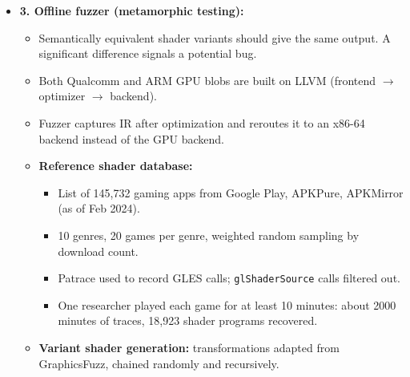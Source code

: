 \documentclass[11pt,a4paper]{article}
\begin{document}
\begin{enumerate}
\begin{itemize}[leftmargin=*, itemsep=1pt, topsep=2pt]
\begin{itemize}[itemsep=0pt]
\begin{itemize}[itemsep=0pt]
                \item ARM: \texttt{r\{major\}p\{patch\}}.
            \end{itemize}
            \item LLVM compiler version, used when internal version is missing.
            \begin{itemize}[itemsep=0pt]
                \item Regex on version string if not stripped.
                \item Stripped binaries: string fingerprints from LLVM logging statements.
                \item Also Binshape [16] function fingerprinting.
            \end{itemize}
        \end{itemize}
        \item \textbf{3. Offline fuzzer (metamorphic testing):}
        \begin{itemize}[itemsep=0pt]
            \item Semantically equivalent shader variants should give the same output. A significant difference signals a potential bug.
            \item Both Qualcomm and ARM GPU blobs are built on LLVM (frontend $\rightarrow$ optimizer $\rightarrow$ backend).
            \item Fuzzer captures IR after optimization and reroutes it to an x86-64 backend instead of the GPU backend.
            \item \textbf{Reference shader database:}
            \begin{itemize}[itemsep=0pt]
                \item List of 145,732 gaming apps from Google Play, APKPure, APKMirror (as of Feb 2024).
                \item 10 genres, 20 games per genre, weighted random sampling by download count.
                \item Patrace used to record GLES calls; \texttt{glShaderSource} calls filtered out.
                \item One researcher played each game for at least 10 minutes: about 2000 minutes of traces, 18,923 shader programs recovered.
            \end{itemize}
            \item \textbf{Variant shader generation:} transformations adapted from GraphicsFuzz, chained randomly and recursively.
            \begin{itemize}[itemsep=0pt]

\end{itemize}
\end{itemize}
\end{itemize}
\end{enumerate}
\end{document}
